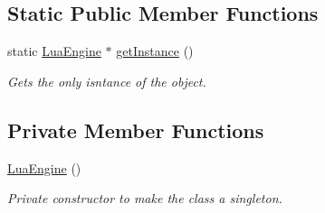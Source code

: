 \subsection*{Static Public Member Functions}
\begin{DoxyCompactItemize}
\item 
static \hyperlink{class_lua_engine}{Lua\-Engine} $\ast$ \hyperlink{class_lua_engine_aded58f5432b1e6598ad3c82ea2e5c0b4}{get\-Instance} ()
\begin{DoxyCompactList}\small\item\em Gets the only isntance of the object. \end{DoxyCompactList}\end{DoxyCompactItemize}
\subsection*{Private Member Functions}
\begin{DoxyCompactItemize}
\item 
\hyperlink{class_lua_engine_a165d91bae4bef0670afd6f73a3e7e6a7}{Lua\-Engine} ()
\begin{DoxyCompactList}\small\item\em Private constructor to make the class a singleton. \end{DoxyCompactList}\end{DoxyCompactItemize}
